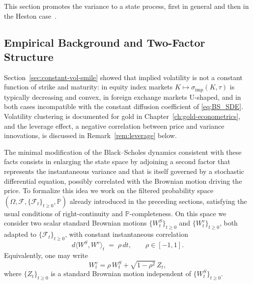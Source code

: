 This section promotes the variance to a state process, first in general and then in the Heston case~\cite{Heston1993}.
\subsection{Empirical Background and Two-Factor Structure}


Section~\ref{sec:constant-vol-smile} showed that implied volatility is not a
constant function of strike and maturity: in equity index markets
$K\mapsto \sigma_{\mathrm{imp}}(K,\tau)$ is typically decreasing and convex,
in foreign exchange markets U-shaped, and in both cases incompatible with the
constant diffusion coefficient of \eqref{eq:BS_SDE}. Volatility clustering is
documented for gold in Chapter~\ref{ch:gold-econometrics}, and the leverage
effect, a negative correlation between price and variance innovations, is
discussed in Remark~\ref{rem:leverage} below.


The minimal modification of the Black--Scholes dynamics consistent with
these facts consists in enlarging the state space by adjoining a second
factor that represents the instantaneous variance and that is itself
governed by a stochastic differential equation, possibly correlated with
the Brownian motion driving the price. To formalize this idea we work on
the filtered probability space
$(\Omega,\mathcal{F},\{\mathcal{F}_t\}_{t\geq 0},\mathbb{P})$ already
introduced in the preceding sections, satisfying the usual conditions of
right-continuity and $\mathbb{P}$-completeness. On this space we consider
two scalar standard Brownian motions $\{W^{S}_t\}_{t\geq 0}$ and
$\{W^{v}_t\}_{t\geq 0}$, both adapted to $\{\mathcal{F}_t\}_{t\geq 0}$,
with constant instantaneous correlation
\begin{equation}\label{eq:SV_corr}
d\langle W^{S},W^{v}\rangle_t \;=\; \rho\,dt,
\qquad \rho\in[-1,1].
\end{equation}
Equivalently, one may write
\begin{equation}\label{eq:SV_BM_decomposition}
W^{v}_t
=
\rho\,W^{S}_t+\sqrt{1-\rho^{2}}\,Z_t,
\end{equation}
where $\{Z_t\}_{t\geq 0}$ is a standard Brownian motion independent of
$\{W^{S}_t\}_{t\geq 0}$.

